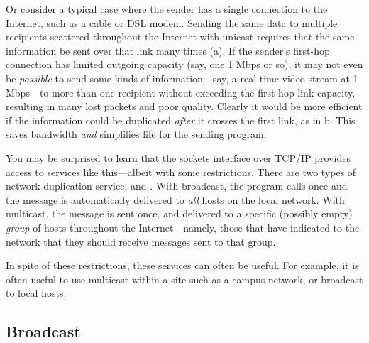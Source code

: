 Or consider a typical case where the sender has a single connection to
the Internet, such as a cable or DSL modem.  Sending the same data to
multiple recipients scattered throughout the Internet with unicast
requires that the same information be sent over that link many times
(a).  If the sender's first-hop connection has limited
outgoing capacity (say, one 1 Mbps or so), it may not even be
\emph{possible\/} to send some kinds of information---say, a real-time
video stream at 1 Mbps---to more than one recipient without exceeding
the first-hop link capacity, resulting in many lost packets and
poor quality.
%
Clearly it would be more efficient
if the information could be duplicated \emph{after\/} it crosses the first
link, as in b.
This saves bandwidth \emph{and\/} simplifies life for the sending program.

You may be surprised to learn that the sockets interface over TCP/IP
provides access to services like this---albeit with some
restrictions.  There are two types of
network duplication service:  and .
With broadcast, the program calls 
once and the message is automatically delivered
to \emph{all\/} hosts on the local network.
With multicast, the message is sent once, and delivered
to a specific (possibly empty) \emph{group\/} of hosts throughout the
Internet---namely, those that have
indicated to the network that they should receive messages sent to that group.

In spite of these restrictions, these services can often be useful.
For example, it is often useful to use multicast within a site such
as a campus network, or broadcast to local hosts.

\subsection{Broadcast}

